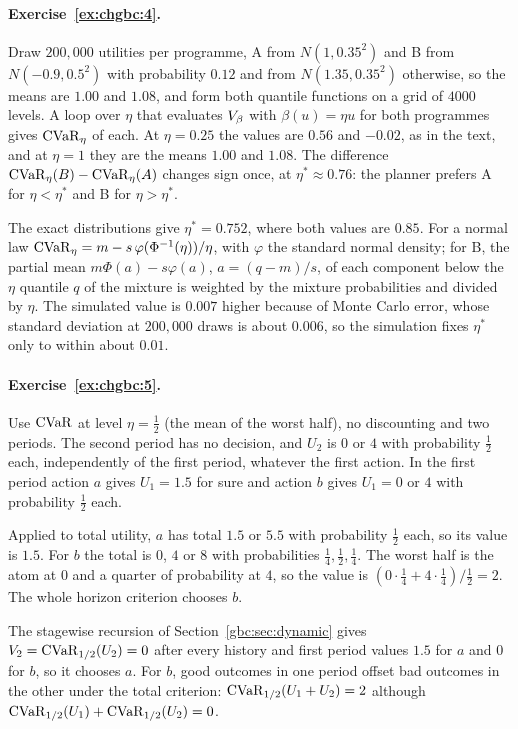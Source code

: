 \paragraph{Exercise~\ref{ex:chgbc:4}.} Draw $200{,}000$ utilities per programme, A from $N(1,0.35^2)$ and B from $N(-0.9,0.5^2)$ with probability $0.12$ and from $N(1.35,0.35^2)$ otherwise, so the means are $1.00$ and $1.08$, and form both quantile functions on a grid of $4000$ levels. A loop over $\eta$ that evaluates $V_{\beta}$ with $\beta(u)=\eta u$ for both programmes gives $\mathrm{CVaR}_\eta$ of each. At $\eta=0.25$ the values are $0.56$ and $-0.02$, as in the text, and at $\eta=1$ they are the means $1.00$ and $1.08$. The difference $\mathrm{CVaR}_\eta(B)-\mathrm{CVaR}_\eta(A)$ changes sign once, at $\eta^\ast\approx0.76$: the planner prefers A for $\eta<\eta^\ast$ and B for $\eta>\eta^\ast$.

The exact distributions give $\eta^\ast=0.752$, where both values are $0.85$. For a normal law $\mathrm{CVaR}_\eta=m-s\,\varphi(\Phi^{-1}(\eta))/\eta$, with $\varphi$ the standard normal density; for B, the partial mean $m\Phi(a)-s\varphi(a)$, $a=(q-m)/s$, of each component below the $\eta$ quantile $q$ of the mixture is weighted by the mixture probabilities and divided by $\eta$. The simulated value is $0.007$ higher because of Monte Carlo error, whose standard deviation at $200{,}000$ draws is about $0.006$, so the simulation fixes $\eta^\ast$ only to within about $0.01$.

\paragraph{Exercise~\ref{ex:chgbc:5}.} Use $\mathrm{CVaR}$ at level $\eta=\tfrac12$ (the mean of the worst half), no discounting and two periods. The second period has no decision, and $U_2$ is $0$ or $4$ with probability $\tfrac12$ each, independently of the first period, whatever the first action. In the first period action $a$ gives $U_1=1.5$ for sure and action $b$ gives $U_1=0$ or $4$ with probability $\tfrac12$ each.

Applied to total utility, $a$ has total $1.5$ or $5.5$ with probability $\tfrac12$ each, so its value is $1.5$. For $b$ the total is $0$, $4$ or $8$ with probabilities $\tfrac14,\tfrac12,\tfrac14$. The worst half is the atom at $0$ and a quarter of probability at $4$, so the value is $(0\cdot\tfrac14+4\cdot\tfrac14)/\tfrac12=2$. The whole horizon criterion chooses $b$.

The stagewise recursion of Section~\ref{gbc:sec:dynamic} gives $V_2 = \mathrm{CVaR}_{1/2}(U_2) = 0$ after every history and first period values $1.5$ for $a$ and $0$ for $b$, so it chooses $a$. For $b$, good outcomes in one period offset bad outcomes in the other under the total criterion: $\mathrm{CVaR}_{1/2}(U_1 + U_2) = 2$ although $\mathrm{CVaR}_{1/2}(U_1) + \mathrm{CVaR}_{1/2}(U_2) = 0$.

